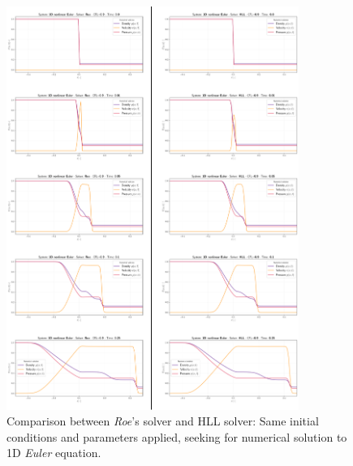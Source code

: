 \begin{figure}[ht]
	\includegraphics[width=0.85\textwidth]{RoevsHLL.eps}
	\caption{Comparison between \emph{Roe}'s solver and HLL solver: 
	Same initial conditions and parameters applied, seeking for numerical solution to 
	1D \emph{Euler} equation.}
	\label{\LABEL}
\end{figure}
